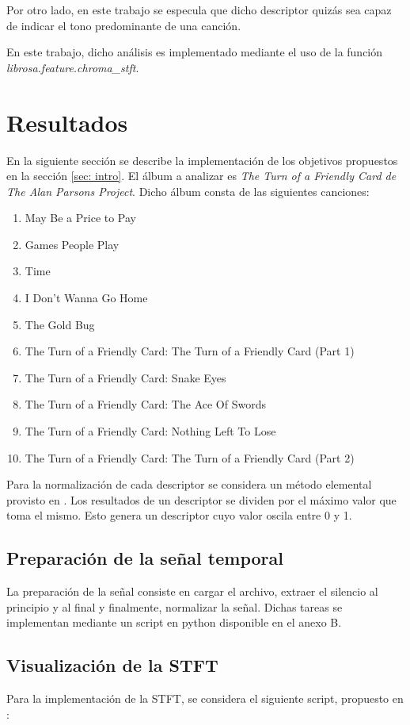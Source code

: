 \documentclass[]{article}
\begin{document}
\begin{multicols}{2}
Por otro lado, en este trabajo se especula que dicho descriptor quizás sea capaz de indicar el tono
predominante de una canción.

En este trabajo, dicho análisis es implementado mediante el uso de la función \emph{{librosa.feature.chroma\_stft}}.

\section{Resultados}
En la siguiente sección se describe la implementación de los objetivos propuestos
en la sección \ref{sec: intro}. El álbum a analizar es \emph{The Turn of a Friendly
Card  \emph{de} The Alan Parsons Project}. Dicho álbum consta de las siguientes
canciones:
\begin{enumerate}
  \item May Be a Price to Pay
  \item Games People Play
  \item Time
  \item I Don't Wanna Go Home
  \item The Gold Bug
  \item The Turn of a Friendly Card: The Turn of a Friendly Card (Part 1)
  \item The Turn of a Friendly Card: Snake Eyes
  \item The Turn of a Friendly Card: The Ace Of Swords
  \item The Turn of a Friendly Card: Nothing Left To Lose
  \item The Turn of a Friendly Card: The Turn of a Friendly Card (Part 2)
\end{enumerate}

Para la normalización de cada descriptor se considera un método elemental provisto
en \cite{witten2005data}. Los resultados de un descriptor se dividen
por el máximo valor que toma el mismo. Esto genera un descriptor cuyo valor
oscila entre 0 y 1.

\subsection{Preparación de la señal temporal}

\label{sec: prep}
La preparación de la señal consiste en cargar el archivo, extraer el silencio
al principio y al final y finalmente, normalizar la señal. Dichas tareas se
implementan mediante un script en python disponible en el anexo B.

\subsection{Visualización de la STFT}
\label{sec: stft}
Para la implementación de la STFT, se considera el siguiente script, propuesto
en \cite{stft}:


\end{multicols}
\end{document}
